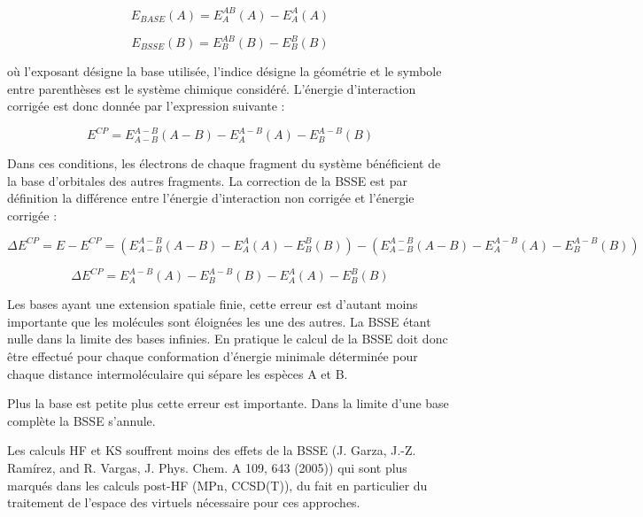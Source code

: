 \begin{equation}
E_{BASE}(A) = E_{A}^{AB}(A) - E_{A}^{A}(A)
\end{equation}

\begin{equation}
E_{BSSE}(B) = E_{B}^{AB}(B) - E_{B}^{B}(B)
\end{equation}

où l'exposant désigne la base utilisée, l'indice désigne la géométrie et le symbole entre parenthèses est le système chimique considéré.
L'énergie d'interaction corrigée est donc donnée par l'expression suivante :

\begin{equation}
E^{CP} = E_{A-B}^{A-B}(A-B) - E_{A}^{A-B}(A) - E_{B}^{A-B}(B)
\end{equation}

Dans ces conditions, les électrons de chaque fragment du système bénéficient de la base d'orbitales des autres fragments. La correction de la BSSE est par définition la différence entre l'énergie d'interaction non corrigée et l'énergie corrigée :

\begin{equation}
\Delta E^{CP} = E - E^{CP} = (E_{A-B}^{A-B}(A-B) - E_{A}^{A}(A) - E_{B}^{B}(B)) - (E_{A-B}^{A-B}(A-B) - E_{A}^{A-B}(A) - E_{B}^{A-B}(B))
\end{equation}

\begin{equation}
\Delta E^{CP} =  E_{A}^{A-B}(A) - E_{B}^{A-B}(B) - E_{A}^{A}(A) - E_{B}^{B}(B)
\end{equation}

Les bases ayant une extension spatiale finie, cette erreur est d'autant moins importante que les molécules sont éloignées les une des autres. La BSSE étant nulle dans la limite des bases infinies.
En pratique le calcul de la BSSE doit donc être effectué pour chaque conformation d’énergie minimale déterminée pour chaque distance intermoléculaire qui sépare les espèces A et B.

Plus la base est petite plus cette erreur est importante. 
Dans la limite d’une base complète la BSSE s’annule.

Les calculs HF et KS souffrent moins des effets de la BSSE (J. Garza, J.-Z. Ramírez, and R. Vargas, J. Phys. Chem. A 109, 643 (2005))
qui sont plus marqués dans les calculs post-HF (MPn, CCSD(T)), du fait en particulier du traitement de l’espace des virtuels nécessaire pour ces approches.\\


